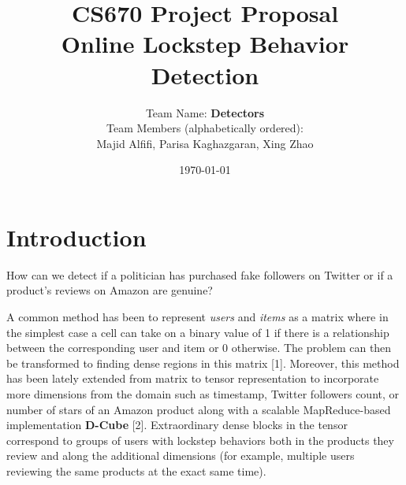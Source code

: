\documentclass[12pt]{article}
\begin{document}
 
 
\title{CS670 Project Proposal\\Online Lockstep Behavior Detection}
\author{
Team Name: \textbf{Detectors}\\[2ex]
\small{Team Members (alphabetically ordered):}\\
Majid Alfifi, Parisa Kaghazgaran,  Xing Zhao
}

\date{\today}
 
 
 
\maketitle
 
 
\section{Introduction}
 

How can we detect if a politician has purchased fake followers on Twitter or if a product's reviews on Amazon are genuine?

A common method has been to represent \emph{users} and \emph{items} as a matrix where in the simplest case a cell can take on a binary value of 1 if there is a relationship between the corresponding user and item or 0 otherwise. The problem can then be transformed to finding dense regions in this matrix [1]. Moreover, this method has been lately extended from matrix to tensor representation to incorporate more dimensions from the domain such as timestamp, Twitter followers count, or number of stars of an Amazon product along with a scalable MapReduce-based implementation \textbf{D-Cube} [2]. Extraordinary dense blocks in the tensor correspond to groups of users with lockstep behaviors both in the products they review and along the additional dimensions (for example, multiple users reviewing the same products at the exact same time). 
\end{document}
